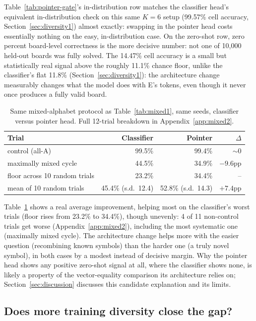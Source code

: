 \documentclass{article} %
\begin{document}
Table~\ref{tab:pointer-gate}'s in-distribution row matches the
classifier head's equivalent in-distribution check on this same $K=6$
setup (99.57\% cell accuracy, Section~\ref{sec:diversity1}) almost
exactly: swapping in the pointer head costs essentially nothing on the
easy, in-distribution case. On the zero-shot row, zero percent
board-level correctness is the more decisive number: not one of
10{,}000 held-out boards was fully solved. The 14.47\% cell accuracy is a
small but statistically real signal above the roughly 11.1\% chance
floor, unlike the classifier's flat 11.8\% (Section~\ref{sec:diversity1}):
the architecture change measurably changes what the model does with E's
tokens, even though it never once produces a fully valid board.

\begin{table}[h]
\centering
\footnotesize
\begin{tabular}{lrrr}
\hline
Trial & Classifier & Pointer & $\Delta$ \\
\hline
control (all-A) & 99.5\% & 99.4\% & $\sim$0 \\
maximally mixed cycle & 44.5\% & 34.9\% & $-9.6$pp \\
floor across 10 random trials & 23.2\% & 34.4\% & -- \\
mean of 10 random trials & 45.4\% (s.d.\ 12.4) & 52.8\% (s.d.\ 14.3) & $+7.4$pp \\
\hline
\end{tabular}
\caption{Same mixed-alphabet protocol as Table~\ref{tab:mixed1}, same
seeds, classifier versus pointer head. Full 12-trial breakdown in
Appendix~\ref{app:mixed2}.}
\label{tab:mixed2}
\end{table}

Table~\ref{tab:mixed2} shows a real average improvement, helping most on
the classifier's worst trials (floor rises from 23.2\% to 34.4\%), though
unevenly: 4 of 11 non-control trials get worse (Appendix~\ref{app:mixed2}),
including the most systematic one (maximally mixed cycle). The
architecture change helps more with the easier question (recombining
known symbols) than the harder one (a truly novel symbol), in both cases
by a modest instead of decisive margin. Why the pointer head shows any
positive zero-shot signal at all, where the classifier shows none, is
likely a property of the vector-equality comparison its architecture
relies on; Section~\ref{sec:discussion} discusses this candidate
explanation and its limits.

\subsection{Does more training diversity close the gap?}
\label{sec:diversity2}
\end{document}
